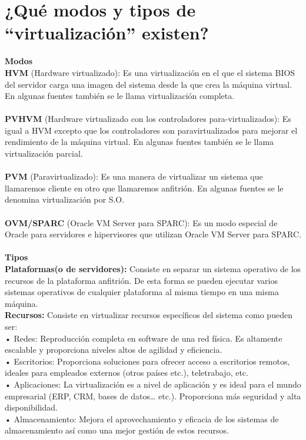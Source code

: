 \section{¿Qué modos \cite{01p11} y tipos \cite{02p12} \cite{02p13} de “virtualización” existen?}
\LARGE {\textbf{Modos}} 
\\
\normalsize
	\textbf{HVM} (Hardware virtualizado): Es una virtualización en el que el sistema BIOS del servidor carga una imagen del sistema  desde la que crea la máquina virtual. En algunas fuentes también se le llama virtualización completa.
\\
\\
	\textbf{PVHVM} (Hardware virtualizado con los controladores para-virtualizados): Es igual a HVM excepto que los controladores son paravirtualizados para mejorar el rendimiento de la máquina virtual. En algunas fuentes también se le llama virtualización parcial.
\\
\\
	\textbf{PVM} (Paravirtualizado): Es una manera de virtualizar un sistema que llamaremos cliente en otro que llamaremos anfitrión. En algunas fuentes se le denomina virtualización por S.O.
\\
\\
	\textbf{OVM/SPARC} (Oracle VM Server para SPARC): Es un modo especial de Oracle para servidores e hipervisores que utilizan Oracle VM Server para SPARC.
\\
\\
\LARGE {\textbf{Tipos}} 
\\
\normalsize
	\textbf{Plataformas(o de servidores):} Consiste en separar un sistema operativo de los recursos de la plataforma anfitrión. De esta forma se pueden ejecutar varios sistemas operativos de cualquier plataforma al misma tiempo en una misma máquina.
\\
	\textbf{Recursos:} Consiste en virtualizar recursos específicos del sistema como pueden ser:
\\
		• Redes: Reproducción completa en software de una red física. Es altamente escalable y proporciona niveles altos de agilidad y eficiencia.
\\
		• Escritorios: Proporciona soluciones para ofrecer acceso a escritorios remotos, ideales para empleados externos (otros países etc.), teletrabajo, etc.
\\
		• Aplicaciones: La virtualización es a nivel de aplicación y es ideal para el mundo empresarial (ERP, CRM, bases de datos… etc.). Proporciona más seguridad y alta disponibilidad.
\\
		• Almacenamiento: Mejora el aprovechamiento y eficacia de los sistemas de almacenamiento así como una mejor gestión de estos recursos.
\clearpage
